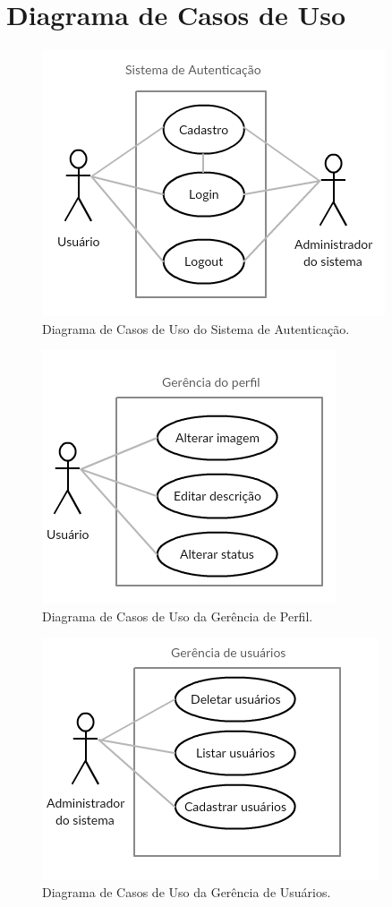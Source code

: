 \documentclass[11pt,a4paper,titlepage]{article}
\begin{document}
\section{Diagrama de Casos de Uso}
\begin{figure}[!h]
	\centering
	\includegraphics[scale=0.8]{img/casosautenticacao.png}
	\caption{Diagrama de Casos de Uso do Sistema de Autenticação.}
\end{figure}
\begin{figure}[!h]
	\centering
	\includegraphics[scale=0.8]{img/casosperfil.png}
	\caption{Diagrama de Casos de Uso da Gerência de Perfil.}
\end{figure}
\begin{figure}[!h]
	\centering
	\includegraphics[scale=0.8]{img/casosusuarios.png}
	\caption{Diagrama de Casos de Uso da Gerência de Usuários.}
\end{figure}
\end{document}

